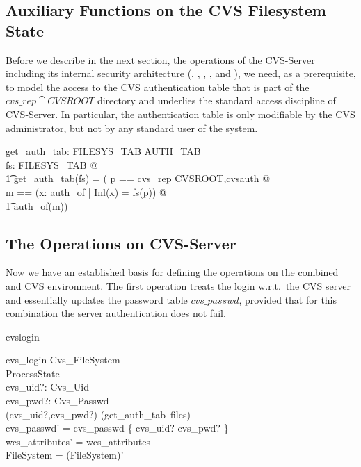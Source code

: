 \subsection{Auxiliary Functions on the CVS Filesystem State}

Before we describe in the next section, the operations of the CVS-Server
including its internal security architecture (, ,
, , and ), we need, as a
prerequisite, to model the access to the CVS authentication table that is part
of the $cvs\_rep \cat CVSROOT$ directory and underlies the standard access
discipline of CVS-Server. In particular, the authentication table is only
modifiable by the CVS administrator, but not by any standard user of the system.
\begin{doc}{7}
  \begin{axdef}
    get\_auth\_tab: FILESYS\_TAB \fun AUTH\_TAB  \\
    \where
    \forall fs: FILESYS\_TAB @ \\
    \t1 get\_auth\_tab(fs) = ( \< \LET p == cvs\_rep \cat \langle
    CVSROOT,cvsauth \rangle @ \\
    \LET m == (\mu x: \dom auth\_of | Inl(x) = fs(p)) @ \\
    \t1 auth\_of(m)) \> \\
  \end{axdef}
\end{doc}


\subsection{The Operations on CVS-Server}

Now we have an established basis for defining the operations on the combined
\unix{} and CVS environment. The first operation treats the login w.r.t.\ the
CVS server and essentially updates the password table $cvs\_passwd$, provided
that for this combination the server authentication does not fail.
\begin{doc}{cvslogin}
  \begin{schema}{cvs\_login}
    \Delta Cvs\_FileSystem\\
    \Xi ProcessState \\
    cvs\_uid?: Cvs\_Uid \\
    cvs\_pwd?: Cvs\_Passwd \\
    \where
    (cvs\_uid?,cvs\_pwd?) \in \dom(get\_auth\_tab~files) \\
    cvs\_passwd' = cvs\_passwd \oplus \{ cvs\_uid? \mapsto cvs\_pwd? \} \\
    wcs\_attributes' = wcs\_attributes \\
    \theta FileSystem = \theta (FileSystem)' \\
  \end{schema}
\end{doc}


